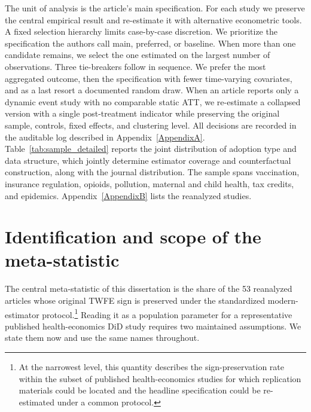 The unit of analysis is the article's main specification. For each study we preserve the central empirical result and re-estimate it with alternative econometric tools. A fixed selection hierarchy limits case-by-case discretion. We prioritize the specification the authors call main, preferred, or baseline. When more than one candidate remains, we select the one estimated on the largest number of observations. Three tie-breakers follow in sequence. We prefer the most aggregated outcome, then the specification with fewer time-varying covariates, and as a last resort a documented random draw. When an article reports only a dynamic event study with no comparable static ATT, we re-estimate a collapsed version with a single post-treatment indicator while preserving the original sample, controls, fixed effects, and clustering level. All decisions are recorded in the auditable log described in Appendix~\ref{AppendixA}. Table~\ref{tab:sample_detailed} reports the joint distribution of adoption type and data structure, which jointly determine estimator coverage and counterfactual construction, along with the journal distribution. The sample spans vaccination, insurance regulation, opioids, pollution, maternal and child health, tax credits, and epidemics. Appendix~\ref{AppendixB} lists the reanalyzed studies.



\section{Identification and scope of the meta-statistic}
\label{sec:identification}

The central meta-statistic of this dissertation is the share of the 53 reanalyzed articles whose original TWFE sign is preserved under the standardized modern-estimator protocol.\footnote{At the narrowest level, this quantity describes the sign-preservation rate within the subset of published health-economics studies for which replication materials could be located and the headline specification could be re-estimated under a common protocol.} Reading it as a population parameter for a representative published health-economics DiD study requires two maintained assumptions. We state them now and use the same names throughout.

